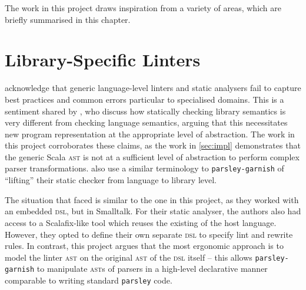 \documentclass[../../main.tex]{subfiles}
\begin{document}
The work in this project draws inspiration from a variety of areas, which are briefly summarised in this chapter.

\section{Library-Specific Linters}
\textcite{renggli_domain-specific_2010} acknowledge that generic language-level linters and static analysers fail to capture best practices and common errors particular to specialised domains.
This is a sentiment shared by \textcite{gregor_stllint_2006}, who discuss how statically checking library semantics is very different from checking language semantics, arguing that this necessitates new program representation at the appropriate level of abstraction.
The work in this project corroborates these claims, as the work in \cref{sec:impl} demonstrates that the generic Scala \textsc{ast} is not at a sufficient level of abstraction to perform complex parser transformations.
\textcite{gregor_stllint_2006} also use a similar terminology to \texttt{parsley-garnish} of ``lifting'' their static checker from language to library level.

The situation that \textcite{renggli_domain-specific_2010} faced is similar to the one in this project, as they worked with an embedded \textsc{dsl}, but in Smalltalk.
For their static analyser, the authors also had access to a Scalafix-like tool which reuses the existing  of the host language.
However, they opted to define their own separate \textsc{dsl} to specify lint and rewrite rules.
In contrast, this project argues that the most ergonomic approach is to model the linter \textsc{ast} on the original \textsc{ast} of the \textsc{dsl} itself -- this allows \texttt{parsley-garnish} to manipulate \textsc{ast}s of parsers in a high-level declarative manner comparable to writing standard \texttt{parsley} code.
\end{document}
